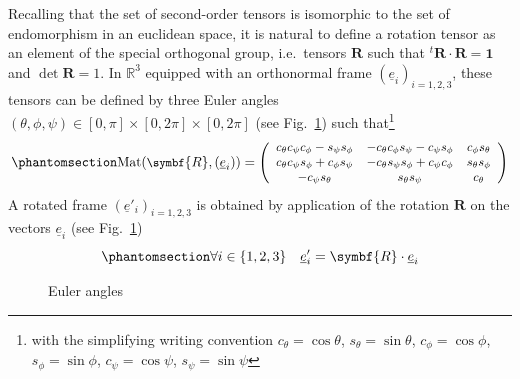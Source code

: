 \documentclass[
  a4paper,
  numbers=noendperiod,
  DIV=12]{scrreprt}
\newcommand{\R}{{\mathbb{{R}}}}
\newcommand{\uu}[1]{{\symbf{{#1}}}}
\newcommand{\uv}[1]{{\underline{{#1}}}}
\newcommand{\ve}[1]{{\uv{{e}}_{{#1}}}}
\newcommand{\trans}[1]{{{}^{t}{#1}}}
\DeclareMathOperator{\Mat}{Mat}
\begin{document}
Recalling that the set of second-order tensors is isomorphic to the set
of endomorphism in an euclidean space, it is natural to define a
rotation tensor as an element of the special orthogonal group,
i.e.~tensors \(\uu{R}\) such that \(\trans{\uu{R}}\cdot\uu{R}=\uu{1}\)
and \(\det{\uu{R}}=1\). In \(\R^3\) equipped with an orthonormal frame
\((\ve{i})_{i=1,2,3}\), these tensors can be defined by three Euler
angles \((θ,ϕ,ψ)∈[0,π]×[0,2π]×[0,2π]\) (see Fig.~\ref{fig-eulerangles})
such that\footnote{with the simplifying writing convention
  \(c_\theta=\cos\theta\), \(s_\theta=\sin\theta\), \(c_\phi=\cos\phi\),
  \(s_\phi=\sin\phi\), \(c_\psi=\cos\psi\), \(s_\psi=\sin\psi\)}
\begin{equation}\phantomsection\label{eq-rot3}{
\small
\Mat(\uu{R},(\ve{i}))=
   \left(
   \begin{array}{ccc}
   c_\theta  c_\psi  c_\phi - s_\psi  s_\phi & - c_\theta  c_\phi  s_\psi - c_\psi  s_\phi & c_\phi  s_\theta \\
   c_\theta  c_\psi  s_\phi + c_\phi  s_\psi & - c_\theta  s_\psi  s_\phi + c_\psi  c_\phi & s_\theta  s_\phi \\
   - c_\psi  s_\theta & s_\theta  s_\psi & c_\theta \\
   \end{array}
   \right) 
}\end{equation} A rotated frame \((\underline{e}'_i)_{i=1,2,3}\) is
obtained by application of the rotation \(\uu{R}\) on the vectors
\(\ve{i}\) (see Fig.~\ref{fig-eulerangles})
\begin{equation}\phantomsection\label{eq-Rei}{
\forall i \in \{1,2,3\}\quad \underline{e}'_i=\uu{R}\cdot\ve{i}
}\end{equation}

\begin{figure}


\caption{\label{fig-eulerangles}Euler angles}

\end{figure}%
\end{document}
